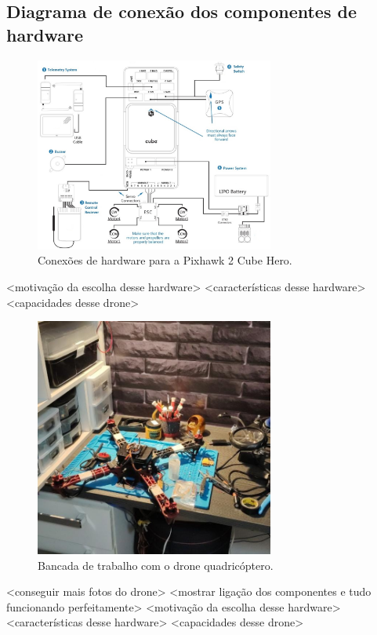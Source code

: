 \documentclass[12pt,a4paper,oneside]{book}
\begin{document}
\subsection{Diagrama de conexão dos componentes de hardware}
%
\begin{figure}[!htbp]
  \centering
  \includegraphics[width=0.7\textwidth]{Images/Diagramas/cube_wiring_overview.jpg}
  \caption{Conexões de hardware para a Pixhawk 2 Cube Hero.}
  \label{fig:cube_wiring_overview.jpg.0}
\end{figure}
%
<motivação da escolha desse hardware>
<características desse hardware>
<capacidades desse drone>
%
\begin{figure}[!htbp]
  \centering
  \includegraphics[width=0.7\textwidth]{Images/Desenvolvimento/omnibus_drone.jpeg}
  \caption{Bancada de trabalho com o drone quadricóptero.}
  \label{fig:omnibus_drone.jpeg.0}
\end{figure}
%
<conseguir mais fotos do drone>
<mostrar ligação dos componentes e tudo funcionando perfeitamente>
<motivação da escolha desse hardware>
<características desse hardware>
<capacidades desse drone>
\end{document}
